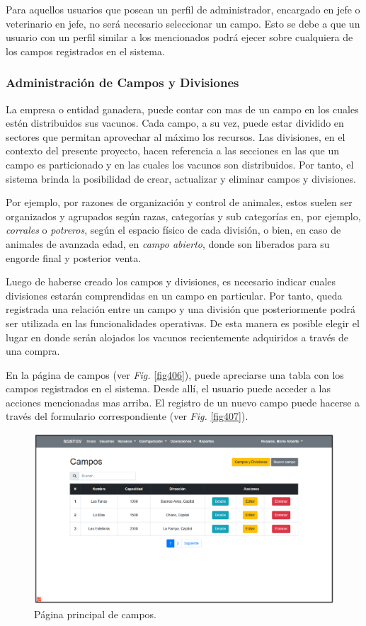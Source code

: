 \documentclass[11pt,oneside]{book}
\begin{document}
\newpage
Para aquellos usuarios que posean un perfil de administrador, encargado en jefe o veterinario en jefe, no será necesario seleccionar un campo. Esto se debe a que un usuario con un perfil similar a los mencionados podrá ejecer sobre cualquiera de los campos registrados en el sistema.

\subsubsection{Administración de Campos y Divisiones}
La empresa o entidad ganadera, puede contar con mas de un campo en los cuales estén distribuidos sus vacunos. Cada campo, a su vez, puede estar dividido en sectores que permitan aprovechar al máximo los recursos. Las divisiones, en el contexto del presente proyecto, hacen referencia a las secciones en las que un campo es particionado y en las cuales los vacunos son distribuidos. Por tanto, el sistema brinda la posibilidad de crear, actualizar y eliminar campos y divisiones. 

 Por ejemplo, por razones de organización y control de animales, estos suelen ser organizados y agrupados según razas, categorías y sub categorías en, por ejemplo, \textit{corrales} o \textit{potreros}, según el espacio físico de cada división, o bien, en caso de animales de avanzada edad, en \textit{campo abierto}, donde son liberados para su engorde final y posterior venta.

Luego de haberse creado los campos y divisiones, es necesario indicar cuales divisiones estarán comprendidas en un campo en particular. Por tanto, queda registrada una relación entre un campo y una división que posteriormente podrá ser utilizada en las funcionalidades operativas. De esta manera es posible elegir el lugar en donde serán alojados los vacunos recientemente adquiridos a través de una compra.

En la página de campos (ver \textit{Fig.} \eqref{fig406}), puede apreciarse una tabla con los campos registrados en el sistema. Desde allí, el usuario puede acceder a las acciones mencionadas mas arriba. El registro de un nuevo campo puede hacerse a través del formulario correspondiente (ver \textit{Fig.} \eqref{fig407}). 

\begin{figure}[tbhp]
\centerline{\includegraphics[scale=0.87]{figs/capitulo_3_desarrollo/fig406.pdf}}
\caption{Página principal de campos.}
\label{fig406}
\end{figure}
\end{document}
